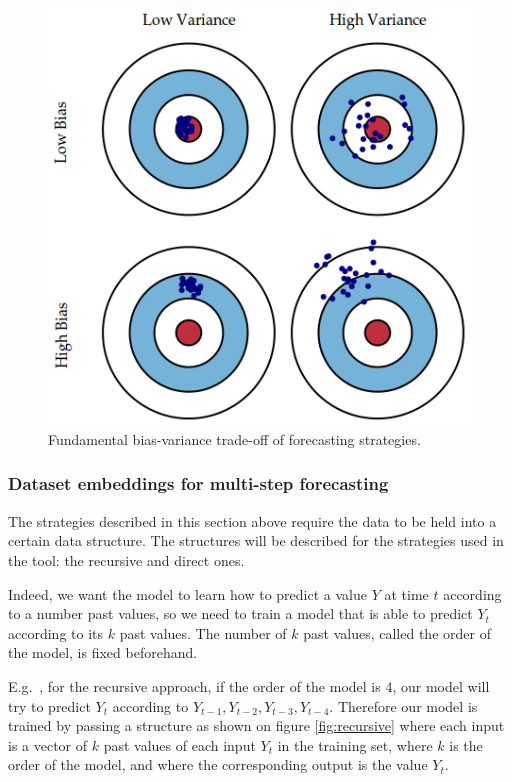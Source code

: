 \documentclass[11pt,a4paper,oneside]{book}
\begin{document}
\begin{figure}[!h]
  \centering
    \includegraphics[scale=0.5]{img/bias-variance.png}
  \caption{Fundamental bias-variance trade-off of forecasting strategies.}
  \label{fig:biasvariance}
\end{figure}



\subsubsection{Dataset embeddings for multi-step forecasting}

The strategies described in this section above require the data to be held into a certain data structure. The structures will be described for the strategies used in the tool: the recursive and direct ones. 

Indeed, we want the model to learn how to predict a value $Y$ at time $t$ according to a number past values, so we need to train a model that is able to predict $Y_t$ according to its $k$ past values. The number of $k$ past values, called the order of the model, is fixed beforehand.  

E.g.\ , for the recursive approach, if the order of the model is 4, our model will try to predict $Y_t$ according to  $Y_{t-1}, Y_{t-2}, Y_{t-3}, Y_{t-4}$. Therefore our model is trained by passing a structure as shown on figure \ref{fig:recursive} where each input is a vector of $k$ past values of each input $Y_t$ in the training set, where $k$ is the order of the model, and where the corresponding output is the value $Y_t$. 
 
\end{document}
